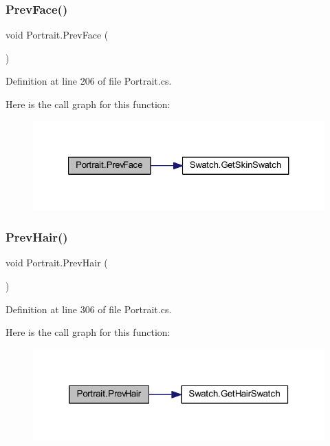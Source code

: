 \subsubsection{\texorpdfstring{PrevFace()}{PrevFace()}}
{\footnotesize\ttfamily void Portrait.\+Prev\+Face (\begin{DoxyParamCaption}{ }\end{DoxyParamCaption})}



Definition at line 206 of file Portrait.\+cs.

Here is the call graph for this function\+:
\nopagebreak
\begin{figure}[H]
\begin{center}
\leavevmode
\includegraphics[width=327pt]{class_portrait_aa550ccd7202589090d88e812743da74a_cgraph}
\end{center}
\end{figure}
\mbox{\label{class_portrait_af7fdde58c645c6e4fa5195ed3547b3d9}} 
\subsubsection{\texorpdfstring{PrevHair()}{PrevHair()}}
{\footnotesize\ttfamily void Portrait.\+Prev\+Hair (\begin{DoxyParamCaption}{ }\end{DoxyParamCaption})}



Definition at line 306 of file Portrait.\+cs.

Here is the call graph for this function\+:
\nopagebreak
\begin{figure}[H]
\begin{center}
\leavevmode
\includegraphics[width=320pt]{class_portrait_af7fdde58c645c6e4fa5195ed3547b3d9_cgraph}
\end{center}
\end{figure}
\mbox{\label{class_portrait_a29b9670f2b653ffe43cf81e94e90062a}} 
